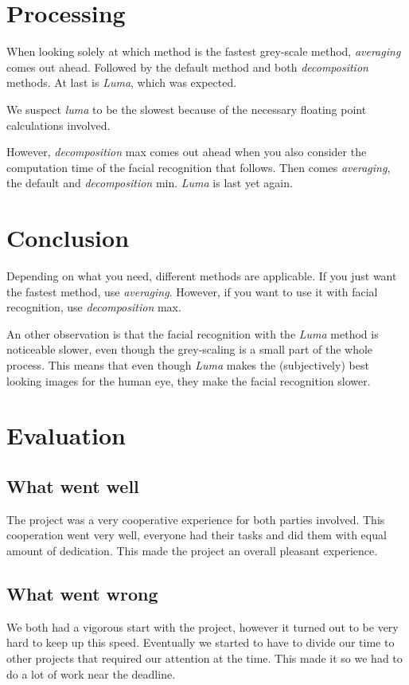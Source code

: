\documentclass[a4paper]{article}
\begin{document}
\section{Processing}
When looking solely at which method is the fastest grey-scale method, \textit{averaging} comes out ahead. Followed by the default method and both \textit{decomposition} methods. At last is \textit{Luma}, which was expected.

We suspect \textit{luma} to be the slowest because of the necessary floating point calculations involved. 

However, \textit{decomposition} max comes out ahead when you also consider the computation time of the facial recognition that follows. Then comes \textit{averaging}, the default and \textit{decomposition} min. \textit{Luma} is last yet again.

\section{Conclusion}
Depending on what you need, different methods are applicable. If you just want the fastest method, use \textit{averaging}. However, if you want to use it with facial recognition, use \textit{decomposition} max.

An other observation is that the facial recognition with the \textit{Luma} method is noticeable slower, even though the grey-scaling is a small part of the whole process. This means that even though \textit{Luma} makes the (subjectively) best looking images for the human eye, they make the facial recognition slower.

\section{Evaluation}
\subsection{What went well}
The project was a very cooperative experience for both parties involved. This cooperation went very well, everyone had their tasks and did them with equal amount of dedication. This made the project an overall pleasant experience.
\subsection{What went wrong}
We both had a vigorous start with the project, however it turned out to be very hard to keep up this speed. Eventually we started to have to divide our time to other projects that required our attention at the time. This made it so we had to do a lot of work near the deadline.
\end{document}
